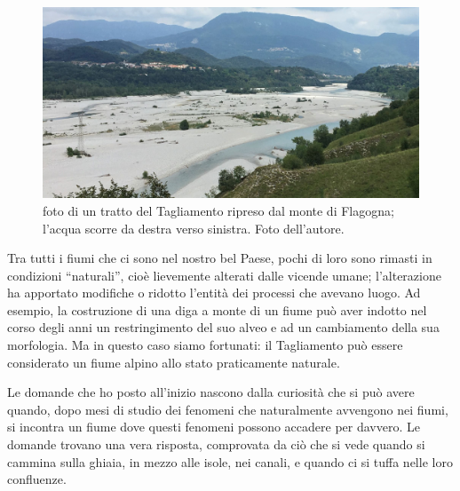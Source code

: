 \begin{figure}
	\centering
	\includegraphics[width=\textwidth]{files/foto_terrazzo_valle_pinzano.jpg}
	\caption[foto di un tratto del Tagliamento ripreso dal monte di Flagogna]{foto di un tratto del Tagliamento ripreso dal monte di Flagogna; l'acqua scorre da destra verso sinistra. Foto dell'autore.
	}
	\label{fig:foto-pinzano}
\end{figure}


Tra tutti i fiumi che ci sono nel nostro bel Paese, pochi di loro sono rimasti in condizioni “naturali”, cioè lievemente alterati dalle vicende umane; l'alterazione ha apportato modifiche o ridotto l'entità dei processi che avevano luogo. 
Ad esempio, la costruzione di una diga a monte di un fiume può aver indotto nel corso degli anni un restringimento del suo alveo e ad un cambiamento della sua morfologia.
Ma in questo caso siamo fortunati: il Tagliamento può essere considerato un fiume alpino allo stato praticamente naturale.

Le domande che ho posto all'inizio nascono dalla curiosità che si può avere quando, dopo mesi di studio dei fenomeni che naturalmente avvengono nei fiumi, si incontra un fiume dove questi fenomeni possono accadere per davvero. Le domande trovano una vera risposta, comprovata da ciò che si vede quando si cammina sulla ghiaia, in mezzo alle isole, nei canali, e quando ci si tuffa nelle loro confluenze.


